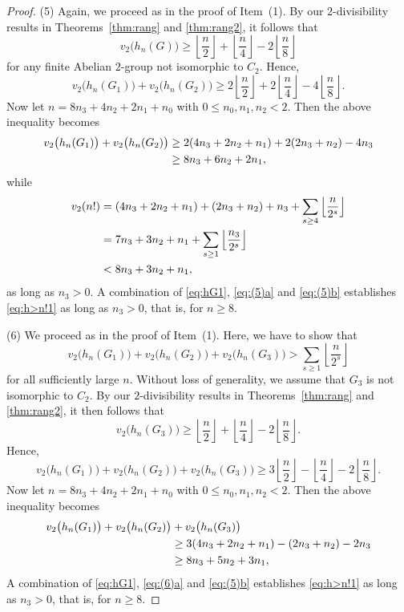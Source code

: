 \documentclass[12pt,reqno]{amsart}
\numberwithin{equation}{section}
\theoremstyle{remark}
\begin{document}
\begin{proof}
\medskip
(5) Again, we proceed as in the proof of Item~(1). 
By our $2$-divisibility results in Theorems~\ref{thm:rang}
and \ref{thm:rang2}, it follows that
$$
v_2\big(h_n(G)\big)\ge 
{\left\lfloor{\frac {n} {2}}\right\rfloor}+{\left\lfloor{\frac {n} {4}}\right\rfloor}-2{\left\lfloor{\frac {n} {8}}\right\rfloor}
$$
for any finite Abelian $2$-group not isomorphic to $C_2$.
Hence,
\begin{equation*} 
v_2\big(h_n(G_1)\big)+v_2\big(h_n(G_2)\big)
\ge 2{\left\lfloor{\frac {n} {2}}\right\rfloor}+2{\left\lfloor{\frac {n} {4}}\right\rfloor}-4{\left\lfloor{\frac {n} {8}}\right\rfloor}.
\end{equation*}
Now let $n=8n_3+4n_2+2n_1+n_0$ with $0\le n_0,n_1,n_2<2$.
Then the above inequality becomes
\begin{align} \notag
v_2\big(h_n(G_1)\big)+v_2\big(h_n(G_2)\big)
&\ge 2(4n_3+2n_2+n_1)+2(2n_3+n_2)-4n_3\\
&\ge 8n_3+6n_2+2n_1,
\label{eq:(5)a}  
\end{align}
while
\begin{align} \notag
v_2(n!)&=(4n_3+2n_2+n_1)+(2n_3+n_2)+n_3+\sum_{s\ge4}{\left\lfloor{\frac {n} {2^s}}\right\rfloor}\\
\notag
&=7n_3+3n_2+n_1+\sum_{s\ge1}{\left\lfloor{\frac {n_3} {2^s}}\right\rfloor}\\
&< 8n_3+3n_2+n_1,
\label{eq:(5)b}  
\end{align}
as long as $n_3>0$.
A combination of 
\eqref{eq:hG1}, \eqref{eq:(5)a} and
\eqref{eq:(5)b} establishes \eqref{eq:h>n!1} as long as
$n_3>0$, that is, for $n\ge 8$.

\medskip
(6) We proceed as in the proof of Item~(1). 
Here, we have to show that
\begin{equation} \label{eq:h>n!4} 
v_2\big(h_n(G_1)\big)+v_2\big(h_n(G_2)\big)
+v_2\big(h_n(G_3)\big)
>\sum_{s\ge1}{\left\lfloor{\frac {n} {2^s}}\right\rfloor}
\end{equation}
for all sufficiently large $n$.
Without loss of
generality, we assume that $G_3$ is not isomorphic to $C_2$.
By our $2$-divisibility results in Theorems~\ref{thm:rang}
and \ref{thm:rang2}, it then follows that
$$
v_2\big(h_n(G_3)\big)\ge 
{\left\lfloor{\frac {n} {2}}\right\rfloor}+{\left\lfloor{\frac {n} {4}}\right\rfloor}-2{\left\lfloor{\frac {n} {8}}\right\rfloor}.
$$
Hence,
\begin{equation*} 
v_2\big(h_n(G_1)\big)+v_2\big(h_n(G_2)\big)
+v_2\big(h_n(G_3)\big)
\ge 3{\left\lfloor{\frac {n} {2}}\right\rfloor}-{\left\lfloor{\frac {n} {4}}\right\rfloor}-2{\left\lfloor{\frac {n} {8}}\right\rfloor}.
\end{equation*}
Now let $n=8n_3+4n_2+2n_1+n_0$ with $0\le n_0,n_1,n_2<2$.
Then the above inequality becomes
\begin{align} \notag
v_2\big(h_n(G_1)\big)+v_2\big(h_n(G_2)\big)
&+v_2\big(h_n(G_3)\big)\\
\notag
&\ge 3(4n_3+2n_2+n_1)-(2n_3+n_2)-2n_3\\
&\ge 8n_3+5n_2+3n_1,
\label{eq:(6)a}  
\end{align}
A combination of 
\eqref{eq:hG1}, \eqref{eq:(6)a} and
\eqref{eq:(5)b} establishes \eqref{eq:h>n!1} as long as
$n_3>0$, that is, for $n\ge 8$.


\end{proof}
\end{document}
